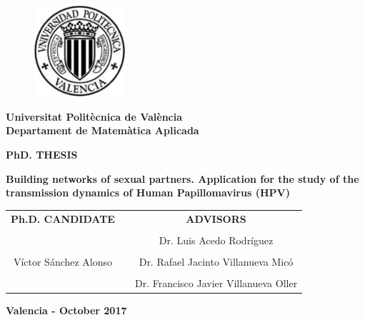 \thispagestyle{empty}

\begin{figure}[h]
  	\centering
  	 \includegraphics[width=0.3\textwidth]{IMG/escudo_upv_transp.pdf}
\end{figure}
\begin{center}
\textbf{\normalsize Universitat Polit\`{e}cnica de Val\`{e}ncia}\\
\textbf{\normalsize Departament de Matem\`{a}tica Aplicada}

\vspace{1cm}

\scriptsize{\textbf{PhD. THESIS}}

\vspace{0.5cm}

\begin{center}
\textbf{\Huge Building networks of sexual partners. Application for the study of the transmission dynamics of Human Papillomavirus (HPV)}
\end{center}

\vspace{3cm}

\begin{tabular}{ccc}
\textbf{Ph.D. CANDIDATE} 				& \hspace{0.7cm} &\textbf{ADVISORS} \\
 										& \hspace{0.7cm} &\\
 										& \hspace{0.7cm} &\normalsize{Dr. Luis Acedo Rodr\'{i}guez \hfill} \\
										& \hspace{0.7cm} &\\
\normalsize{V\'{i}ctor S\'{a}nchez Alonso} 	& \hspace{0.7cm} & \normalsize{Dr. Rafael Jacinto Villanueva Mic\'{o} \hfill } \\ 
										& \hspace{0.7cm} &\\
 										& \hspace{0.7cm} & \normalsize{Dr. Francisco Javier Villanueva Oller \hfill} \\ 
\end{tabular} 

\vspace{2cm}

\normalsize{\textbf{Valencia - October 2017}}

\end{center}
